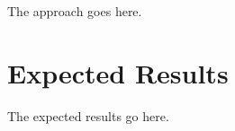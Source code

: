 \documentclass[journal,9pt]{IEEEtran}
\begin{document}
The approach goes here.

\section{Expected Results}

The expected results go here.






\end{document}
